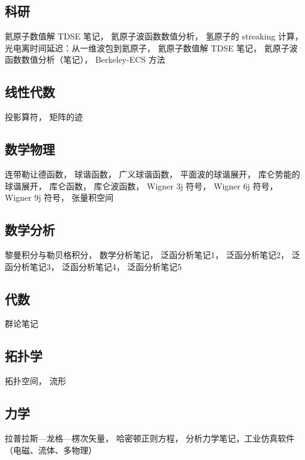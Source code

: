 
\subsection{科研}
氦原子数值解 TDSE 笔记，
氦原子波函数数值分析，
氢原子的 streaking 计算，
光电离时间延迟：从一维波包到氦原子，
氦原子数值解 TDSE 笔记，
氦原子波函数数值分析（笔记），
Berkeley-ECS 方法

\subsection{线性代数}
投影算符， 矩阵的迹

\subsection{数学物理}
连带勒让德函数， 球谐函数， 广义球谐函数， 平面波的球谐展开， 库仑势能的球谐展开， 库仑函数， 库仑波函数， Wigner 3j 符号， Wigner 6j 符号， Wigner 9j 符号， 张量积空间

\subsection{数学分析}
黎曼积分与勒贝格积分， 数学分析笔记， 泛函分析笔记1， 泛函分析笔记2， 泛函分析笔记3， 泛函分析笔记4， 泛函分析笔记5

\subsection{代数}
群论笔记

\subsection{拓扑学}
拓扑空间， 流形

\subsection{力学}
拉普拉斯—龙格—楞次矢量， 哈密顿正则方程， 分析力学笔记，工业仿真软件（电磁、流体、多物理）

